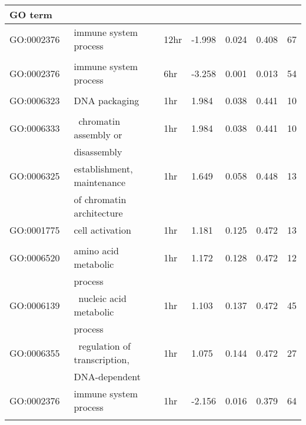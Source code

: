 \begin{table}
\begin{tabular}{lllllll}
            \textbf{GO term}   \\ \midrule
GO:0002376  & immune system process                  & 12hr & -1.998 & 0.024   & 0.408   & 67  \\
            &                                        &      &        &         &         &     \\ \hline
GO:0002376  & immune system process                  & 6hr  & -3.258 & 0.001   & 0.013   & 54  \\
            &                                        &      &        &         &         &     \\ \hline
GO:0006323~ & DNA packaging                          & 1hr  & 1.984  & 0.038   & 0.441   & 10  \\
            &                                        &      &        &         &         &     \\ \hline
GO:0006333  & ~chromatin assembly or~                & 1hr  & 1.984  & 0.038   & 0.441   & 10  \\
            & disassembly                            &      &        &         &         &     \\ \hline
GO:0006325~ & establishment, maintenance~       & 1hr  & 1.649  & 0.058   & 0.448   & 13  \\
            & of chromatin architecture                 &      &        &         &         &     \\ \hline
GO:0001775~ & cell activation                        & 1hr  & 1.181  & 0.125   & 0.472   & 13  \\
            &                                        &      &        &         &         &     \\ \hline
GO:0006520~ & amino acid metabolic            & 1hr  & 1.172  & 0.128   & 0.472   & 12  \\
            &     process                                   &      &        &         &         &     \\ \hline
GO:0006139  & ~nucleic acid metabolic ~ & 1hr  & 1.103  & 0.137   & 0.472   & 45  \\
            &    process   &      &        &         &         &     \\ \hline
GO:0006355  & ~regulation of transcription,~         & 1hr  & 1.075  & 0.144   & 0.472   & 27  \\
            & DNA-dependent                          &      &        &         &         &     \\ \hline
GO:0002376  & immune system process                  & 1hr  & -2.156 & 0.016   & 0.379   & 64  \\
            &                                        &      &        &         &         &    \\ \bottomrule
\end{tabular}
\end{table}

